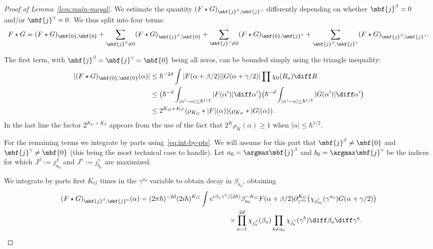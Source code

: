 \documentclass{article}
\numberwithin{equation}{section}
\begin{document}
\begin{proof}[Proof of Lemma~\ref{lem:main-moyal}]
	We estimate the quantity $(F\star G)_{\mbf{j}^\beta,\mbf{j}^\gamma}$ differently depending
	on whether $\mbf{j}^\beta=0$ and/or $\mbf{j}^\gamma = 0$.  We thus split into four terms:
	\[
	F\star G = (F\star G)_{\mbf{0},\mbf{0}}
	+ \sum_{\mbf{j}^\beta \not= 0}(F\star G)_{\mbf{j}^\beta,\mbf{0}}
	+ \sum_{\mbf{j}^\gamma \not= 0}(F\star G)_{\mbf{0},\mbf{j}^\gamma}
	+ \sum_{\mbf{j}^\beta,\mbf{j}^\gamma} (F\star G)_{\mbf{j}^\beta,\mbf{j}^\gamma}.
	\]
	
	The first term, with $\mbf{j}^\beta=\mbf{j}^\gamma = \mbf{0}$ being all zeros, can be bounded simply using the
	triangle inequality:
	\begin{equation}
		\begin{split}
			|(F\star G)_{\mbf{0},\mbf{0}}(\alpha)|
			&\leq  \hbar^{-2d} \int |F(\alpha + \beta/2)| |G(\alpha+\gamma/2)| \prod \chi_0(B_a) \diff B \\
			&\leq
			\big(\hbar^{-d} \int_{|\alpha'-\alpha|\leq \hbar^{1/2}} |F(\alpha')|\diff \alpha'\big)
			\big(\hbar^{-d} \int_{|\alpha'-\alpha|\leq \hbar^{1/2}} |G(\alpha')|\diff \alpha'\big) \\
			&\leq  2^{K_G+K_F}(\rho_{K_G}\ast |F|(\alpha)) (\rho_{K_F}\ast |G|(\alpha)).
		\end{split}
	\end{equation}
	In the last line the factor
	$2^{K_G+K_F}$ appears from the use of the
	fact that
	$2^K\rho_K(\alpha)\geq 1$ when $|\alpha|\leq\hbar^{1/2}$.
	
	For the remaining terms we integrate by parts using~\eqref{eq:int-by-pts}.  We will assume for this part that
	$\mbf{j}^\beta\not=\mbf{0}$ and $\mbf{j}^\gamma\not= \mbf{0}$ (this being the most technical case to handle).
	Let $a_0 = \argmax\mbf{j}^\beta$ and $b_0=\argmax\mbf{j}^\gamma$ be the indices for which $J^\beta := j^\beta_{a_0}$
	and $J^\gamma := j^\gamma_{b_0}$ are maximized.
	
	We integrate by parts first $K_G$ times in the $\gamma^{a_0}$ variable to obtain decay in $\beta_{a_0}$, obtaining
	\begin{equation}
		\begin{split}
			(F\star G)_{\mbf{j}^\beta,\mbf{j}^\alpha}(\alpha) =
			(2\pi \hbar)^{-2d}
			(2i\hbar)^{K_G}
			&\int e^{i \beta_a\gamma^a/(2\hbar)}
			\beta_{a_0}^{-K_G}
			F(\alpha+\beta/2)
			\partial_{\gamma^{a_0}}^{K_G}\big(\chi_{j^\gamma_{a_0}}(\gamma^{a_0})
			G(\alpha+\gamma/2)\big) \\
			&\qquad\qquad\times\prod_{a=1}^{2d} \chi_{j^\beta_a}(\beta_a)
			\prod_{b\not=a_0} \chi_{j^\gamma_b}(\gamma^b)
			\diff \beta_a\diff\gamma^a.
		\end{split}
	\end{equation}
	

\end{proof}
\end{document}
